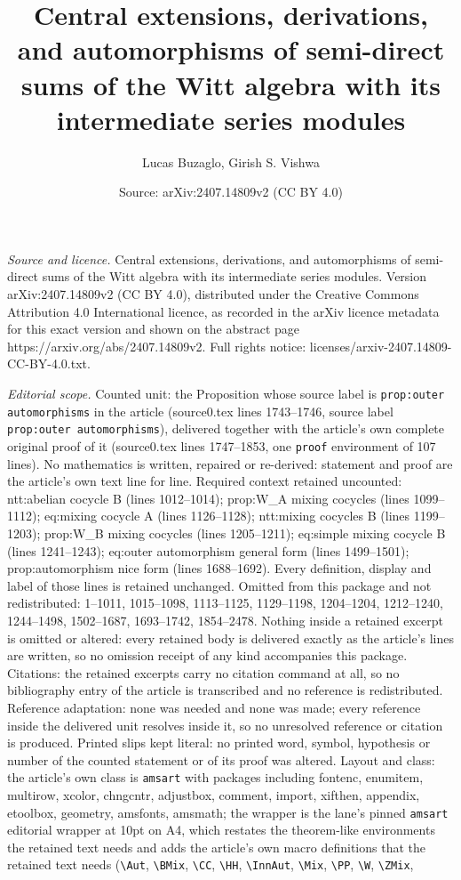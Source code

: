 \documentclass[10pt,a4paper]{amsart}
\title[Central extensions, derivations, and automorphisms of semi-d]{Central extensions, derivations, and automorphisms of semi-direct sums of the Witt algebra with its intermediate series modules}
\author{Lucas Buzaglo, Girish S. Vishwa}
\date{Source: arXiv:2407.14809v2 (CC BY 4.0)}
\begin{document}
\maketitle

\noindent\emph{Source and licence.} Central extensions, derivations, and automorphisms of semi-direct sums of the Witt algebra with its intermediate series modules. Version arXiv:2407.14809v2 (CC BY 4.0), distributed under the Creative Commons Attribution 4.0 International licence, as recorded in the arXiv licence metadata for this exact version and shown on the abstract page https://arxiv.org/abs/2407.14809v2. Full rights notice: licenses/arxiv-2407.14809-CC-BY-4.0.txt.\par\smallskip

\noindent\textit{Editorial scope.} Counted unit: the Proposition whose source label is \texttt{prop:outer automorphisms} in the article (source0.tex lines 1743--1746, source label \texttt{prop:outer automorphisms}), delivered together with the article's own complete original proof of it (source0.tex lines 1747--1853, one \texttt{proof} environment of 107 lines). No mathematics is written, repaired or re-derived: statement and proof are the article's own text line for line. Required context retained uncounted: ntt:abelian cocycle B (lines 1012--1014); prop:W\_A mixing cocycles (lines 1099--1112); eq:mixing cocycle A (lines 1126--1128); ntt:mixing cocycles B (lines 1199--1203); prop:W\_B mixing cocycles (lines 1205--1211); eq:simple mixing cocycle B (lines 1241--1243); eq:outer automorphism general form (lines 1499--1501); prop:automorphism nice form (lines 1688--1692). Every definition, display and label of those lines is retained unchanged. Omitted from this package and not redistributed: 1--1011, 1015--1098, 1113--1125, 1129--1198, 1204--1204, 1212--1240, 1244--1498, 1502--1687, 1693--1742, 1854--2478. Nothing inside a retained excerpt is omitted or altered: every retained body is delivered exactly as the article's lines are written, so no omission receipt of any kind accompanies this package. Citations: the retained excerpts carry no citation command at all, so no bibliography entry of the article is transcribed and no reference is redistributed. Reference adaptation: none was needed and none was made; every reference inside the delivered unit resolves inside it, so no unresolved reference or citation is produced. Printed slips kept literal: no printed word, symbol, hypothesis or number of the counted statement or of its proof was altered. Layout and class: the article's own class is \texttt{amsart} with packages including fontenc, enumitem, multirow, xcolor, chngcntr, adjustbox, comment, import, xifthen, appendix, etoolbox, geometry, amsfonts, amsmath; the wrapper is the lane's pinned \texttt{amsart} editorial wrapper at 10pt on A4, which restates the theorem-like environments the retained text needs and adds the article's own macro definitions that the retained text needs (\texttt{\textbackslash Aut}, \texttt{\textbackslash BMix}, \texttt{\textbackslash CC}, \texttt{\textbackslash HH}, \texttt{\textbackslash InnAut}, \texttt{\textbackslash Mix}, \texttt{\textbackslash PP}, \texttt{\textbackslash W}, \texttt{\textbackslash ZMix}, 
\end{document}
